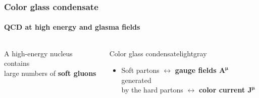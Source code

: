 \documentclass[aspectratio=169,11pt,usenames,dvipsnames]{beamer}
\begin{document}
\begin{frame}
    \frametitle{Color glass condensate}
    \framesubtitle{QCD at high energy and glasma fields}
    \vspace{-15pt}
    \begin{columns}[onlytextwidth,t]

            \begin{center}
                \footnotesize\color{lightgray}A high-energy nucleus contains \\ large numbers of {\bfseries\color{palviolet}soft gluons}
            \end{center}

            \vspace{0pt}
            \hspace{10pt}

            \vspace{0pt}
           
            \begin{custombox2}{Color glass condensate}{lightgray}
                \small
                \begin{varwidth}{0.92\textwidth}
                \begin{itemize}\itemsep0em 
                    \item 
                    Soft partons $\leftrightarrow$ {\color{palviolet}\bfseries gauge fields $\boldsymbol{A^\mu}$} generated \\ by the hard partons $\leftrightarrow$ {\color{palteal}\bfseries color current $\boldsymbol{J^\mu}$}
                \end{itemize}
                \end{varwidth}
            \end{custombox2}


\end{columns}
\end{frame}
\end{document}
